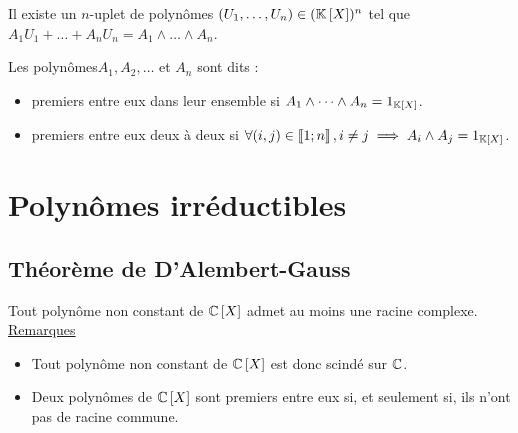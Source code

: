 \begin{defprop}
    Il existe un \(n\)-uplet de polynômes \((U_1, \dots , U_n) \in (\mathbb{K}\left[X\right])^n\) tel que \(A_1U_1 + \dots + A_nU_n = A_1 \wedge \dots \wedge A_n\).
\end{defprop}

\begin{defprop}
Les polynômes\( A_1, A_2, \dots\) et \(A_n\) sont dits :
    \begin{itemize}
        \item premiers entre eux dans leur ensemble si \(A_1 \wedge \dots \wedge A_n = 1_{\mathbb{K}\left[X\right]}\).
        \item premiers entre eux deux à deux si \(\forall (i, j) \in \left\llbracket1;n\right\rrbracket , i\neq j \implies A_i \wedge A_j = 1_{\mathbb{K}\left[X\right]}\).
    \end{itemize}
\end{defprop}

\section{Polynômes irréductibles}
\subsection{Théorème de D’Alembert-Gauss }
\begin{theo}
    Tout polynôme non constant de \( \mathbb{C}\left[X\right]\) admet au moins une racine complexe. \\
    \underline{Remarques} \\
    \begin{itemize}
        \item Tout polynôme non constant de \(\mathbb{C}\left[X\right]\) est donc scindé sur \(\mathbb{C}\).
        \item Deux polynômes de \(\mathbb{C}\left[X\right]\) sont premiers entre eux si, et seulement si, ils n’ont pas de racine commune.
    \end{itemize}
\end{theo}

